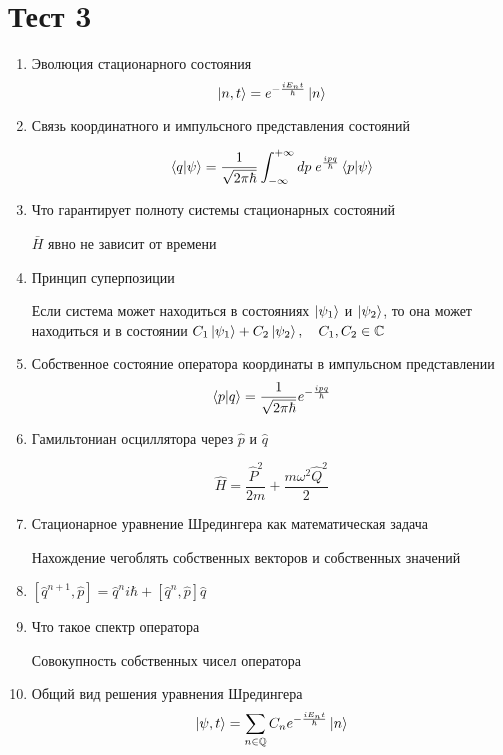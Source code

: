 \section{Тест 3}
\begin{enumerate}
    \item Эволюция стационарного состояния
        $$\ket{n,t}=e^{-\frac{i E_n t}{\hbar}}\ket{n}$$
    \item Связь координатного и импульсного представления состояний
        
$$\braket{q|\psi}=\frac{1}{\sqrt{2\pi\hbar}}\int^{+\infty}_{-\infty}dp\; e^\frac{ipq}{\hbar}\braket{p|\psi}$$
    \item Что гарантирует полноту системы стационарных состояний

        $\bar H$ явно не зависит от времени
    \item Принцип суперпозиции

        Если система может находиться в состояниях $\ket{\psi_1}$ и $\ket{\psi_2}$,
        то она может находиться и в состоянии $C_1\ket{\psi_1}+C_2\ket{\psi_2},\quad C_1,C_2\in \mathbb C$
    \item Собственное состояние оператора координаты в импульсном представлении
        $$\braket{p|q}=\frac{1}{\sqrt{2\pi\hbar}}e^{-\frac{ipq}{\hbar}}$$
    \item Гамильтониан осциллятора через $\hat p$ и $\hat q$

        $$\hat H=\frac{{\hat P}^2}{2m}+\frac{m\omega^2\hat Q^2}{2}$$
    \item Стационарное уравнение Шредингера как математическая задача

        Нахождение чегоблять собственных векторов и собственных значений
    \item $[\hat q^{n+1},\hat p]={\hat q}^ni\hbar + [\hat q^n,\hat p]\hat q$
    \item Что такое спектр оператора

        Совокупность собственных чисел оператора
    \item Общий вид решения уравнения Шредингера
        $$\ket{\psi,t}=\sum_{n\in\mathbb Q} C_n e^{-\frac{iE_n t}{\hbar}}\ket{n}$$
\end{enumerate}
